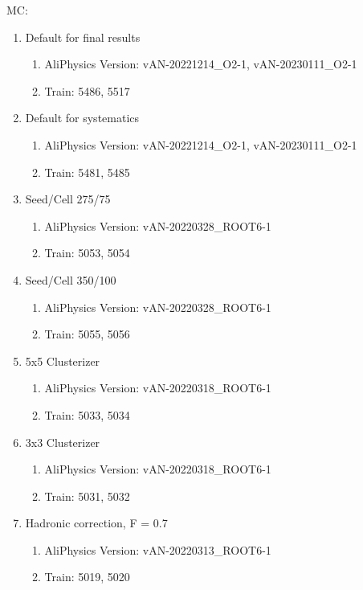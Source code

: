 MC:
\begin{enumerate}
    \item Default for final results
    \begin{enumerate}
        \item AliPhysics Version: vAN-20221214\_O2-1, vAN-20230111\_O2-1
        \item Train: 5486, 5517
    \end{enumerate}
    \item Default for systematics
    \begin{enumerate}
        \item AliPhysics Version: vAN-20221214\_O2-1, vAN-20230111\_O2-1
        \item Train: 5481, 5485
    \end{enumerate}
    \item Seed/Cell 275/75
    \begin{enumerate}
        \item AliPhysics Version: vAN-20220328\_ROOT6-1
        \item Train: 5053, 5054
    \end{enumerate}
    \item Seed/Cell 350/100
    \begin{enumerate}
        \item AliPhysics Version: vAN-20220328\_ROOT6-1
        \item Train: 5055, 5056
    \end{enumerate}
    \item 5x5 Clusterizer
    \begin{enumerate}
        \item AliPhysics Version: vAN-20220318\_ROOT6-1
        \item Train: 5033, 5034
    \end{enumerate}
    \item 3x3 Clusterizer
    \begin{enumerate}
        \item AliPhysics Version: vAN-20220318\_ROOT6-1
        \item Train: 5031, 5032
    \end{enumerate}
    \item Hadronic correction, F = 0.7
    \begin{enumerate}
        \item AliPhysics Version: vAN-20220313\_ROOT6-1
        \item Train: 5019, 5020
    \end{enumerate}

\end{enumerate}
